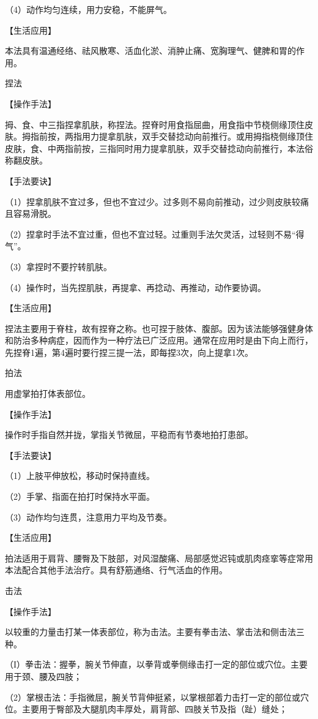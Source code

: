 \documentclass[12pt,UTF8,openany]{ctexbook}
\begin{document}
（4）动作均匀连续，用力安稳，不能屏气。

【生活应用】

本法具有温通经络、祛风散寒、活血化淤、消肿止痛、宽胸理气、健脾和胃的作用。

捏法

【操作手法】

拇、食、中三指捏拿肌肤，称捏法。捏脊时用食指屈曲，用食指中节桡侧缘顶住皮肤。拇指前按，两指用力提拿肌肤，双手交替捻动向前推行。或用拇指桡侧缘顶住皮肤，食、中两指前按，三指同时用力提拿肌肤，双手交替捻动向前推行，本法俗称翻皮肤。

【手法要诀】

（1）捏拿肌肤不宜过多，但也不宜过少。过多则不易向前推动，过少则皮肤较痛且容易滑脱。

（2）捏拿时手法不宜过重，但也不宜过轻。过重则手法欠灵活，过轻则不易“得气”。

（3）拿捏时不要拧转肌肤。

（4）操作时，当先捏肌肤，再提拿、再捻动、再推动，动作要协调。

【生活应用】

捏法主要用于脊柱，故有捏脊之称。也可捏于肢体、腹部。因为该法能够强健身体和防治多种病症，因而作为一种疗法已广泛应用。通常在应用时是由下向上而行，先捏脊1遍，第4遍时要行捏三提一法，即每捏3次，向上提拿1次。

拍法

用虚掌拍打体表部位。

【操作手法】

操作时手指自然并拢，掌指关节微屈，平稳而有节奏地拍打患部。

【手法要诀】

（1）上肢平伸放松，移动时保持直线。

（2）手掌、指面在拍打时保持水平面。

（3）动作均匀连贯，注意用力平均及节奏。

【生活应用】

拍法适用于肩背、腰臀及下肢部，对风湿酸痛、局部感觉迟钝或肌肉痉挛等症常用本法配合其他手法治疗。具有舒筋通络、行气活血的作用。

击法

【操作手法】

以较重的力量击打某一体表部位，称为击法。主要有拳击法、掌击法和侧击法三种。

（I）拳击法：握拳，腕关节伸直，以拳背或拳侧缘击打一定的部位或穴位。主要用于颈、腰及四肢；

（2）掌根击法：手指微屈，腕关节背伸挺紧，以掌根部着力击打一定的部位或穴位。主要用于臀部及大腿肌肉丰厚处，肩背部、四肢关节及指（趾）缝处；
\end{document}

